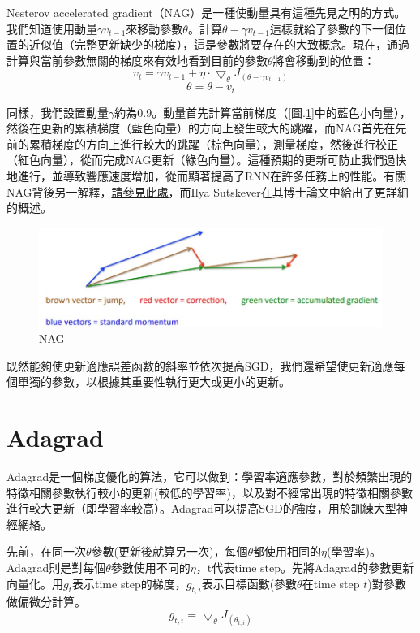 \documentclass[13pt, a4paper]{report}
\begin{document}
Nesterov accelerated gradient（NAG）是一種使動量具有這種先見之明的方式。我們知道使用動量$\gamma v_{t-1}$來移動參數$\theta$。計算$\theta - \gamma v_{t-1}$這樣就給了參數的下一個位置的近似值（完整更新缺少的梯度），這是參數將要存在的大致概念。現在，通過計算與當前參數無關的梯度來有效地看到目前的參數$\theta$將會移動到的位置：
$$v_t = \gamma v_{t-1}+\eta\cdot\bigtriangledown_{\theta}J_{(\theta-\gamma v_{t-1})}$$
$$\theta = \theta - v_t$$

同樣，我們設置動量$\gamma$約為0.9。動量首先計算當前梯度（[圖.\ref{Fig.NAG}]中的藍色小向量），然後在更新的累積梯度（藍色向量）的方向上發生較大的跳躍，而NAG首先在先前的累積梯度的方向上進行較大的跳躍（棕色向量），測量梯度，然後進行校正（紅色向量），從而完成NAG更新（綠色向量）。這種預期的更新可防止我們過快地進行，並導致響應速度增加，從而顯著提高了RNN在許多任務上的性能。有關NAG背後另一解釋，\href{https://cs231n.github.io/neural-networks-3/}{\underline{請參見此處}}，而Ilya Sutskever在其博士論文中給出了更詳細的概述。
\begin{figure}[hbt!]
\center
\includegraphics[width=15cm]{NAG}
\caption{NAG \href{http://www.cs.toronto.edu/~tijmen/csc321/slides/lecture_slides_lec6.pdf}{\faLink}} 
\label{Fig.NAG}
\end{figure}

既然能夠使更新適應誤差函數的斜率並依次提高SGD，我們還希望使更新適應每個單獨的參數，以根據其重要性執行更大或更小的更新。
\section{Adagrad}
Adagrad是一個梯度優化的算法，它可以做到：學習率適應參數，對於頻繁出現的特徵相關參數執行較小的更新(較低的學習率)，以及對不經常出現的特徵相關參數進行較大更新（即學習率較高）。Adagrad可以提高SGD的強度，用於訓練大型神經網絡。

先前，在同一次$\theta$參數(更新後就算另一次)，每個$\theta$都使用相同的$\eta$(學習率)。Adagrad則是對每個$\theta$參數使用不同的$\eta$，t代表time step。先將Adagrad的參數更新向量化。用$g_t$表示time step的梯度，$g_{t,i}$表示目標函數(參數$\theta$在time step $t$)對參數做偏微分計算。
$$g_{t,i}=\bigtriangledown_{\theta}J_{(\theta_{t,i})}$$
\end{document}
